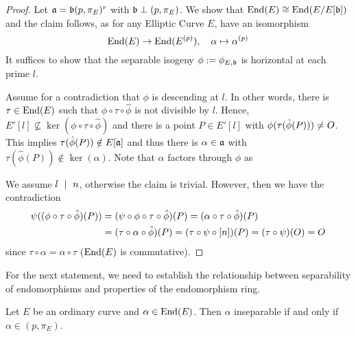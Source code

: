 \begin{proof}
    Let $\mathfrak{a} = \mathfrak{b}(p, \pi_E)^r$ with $\mathfrak{b} \perp (p, \pi_E)$.
    We show that $\mathrm{End}(E) \cong \mathrm{End}(E/E[\mathfrak{b}])$ and the claim follows, as for any Elliptic Curve $E$, have an isomorphism
    \begin{equation*}
        \mathrm{End}(E) \to \mathrm{End}(E^{(p)}), \quad \alpha \mapsto \alpha^{(p)}
    \end{equation*}
    It suffices to show that the separable isogeny $\phi := \phi_{E, \mathfrak{b}}$ is horizontal at each prime $l$.

    Assume for a contradiction that $\phi$ is descending at $l$.
    In other words, there is $\tau \in \mathrm{End}(E)$ such that $\phi \circ \tau \circ \hat{\phi}$ is not divisible by $l$.
    Hence, $E'[l] \not\subseteq \ker(\phi \circ \tau \circ \hat{\phi})$ and there is a point $P \in E'[l]$ with $\phi(\tau(\hat{\phi}(P))) \neq O$.
    This implies $\tau(\hat{\phi}(P)) \notin E[\mathfrak{a}]$ and thus there is $\alpha \in \mathfrak{a}$ with $\tau(\hat{\phi}(P)) \notin \ker(\alpha)$.
    Note that $\alpha$ factors through $\phi$ as
    \begin{center}
    \end{center}
    We assume $l \ \mid \  n$, otherwise the claim is trivial.
    However, then we have the contradiction
    \begin{align*}
        \psi((\phi \circ \tau \circ \hat{\phi})(P)) &= (\psi \circ \phi \circ \tau \circ \hat{\phi})(P) = (\alpha \circ \tau \circ \hat{\phi})(P) \\
        &= (\tau \circ \alpha \circ \hat{\phi})(P) = (\tau \circ \psi \circ [n])(P) = (\tau \circ \psi)(O) = O
    \end{align*}
    since $\tau \circ \alpha = \alpha \circ \tau$ ($\mathrm{End}(E)$ is commutative).
\end{proof}
For the next statement, we need to establish the relationship between separability of endomorphisms and properties of the endomorphism ring.
\begin{lemma}
    \label{prop:inseparable_iff_frobenius_ideal}
    Let $E$ be an ordinary curve and $\alpha \in \mathrm{End}(E)$.
    Then $\alpha$ inseparable if and only if $\alpha \in (p, \pi_E)$.
\end{lemma}
